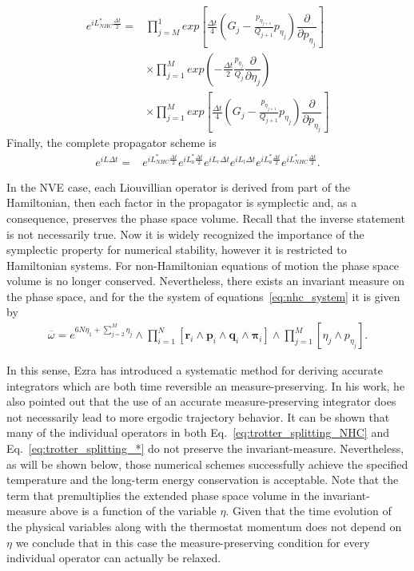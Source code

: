 \documentclass[aip,jcp,reprint,amsmath,amssymb]{revtex4-1}
\newcommand{\vt}[1]{\boldsymbol{\mathbf{#1}}}           %
\newcommand{\diff}[2]{\dfrac{\partial #1}{\partial #2}} %
\begin{document}
\begin{equation}
\begin{split}
e^{iL^\ast_{NHC} \frac{\Delta t}{2}} = &\prod_{j=M}^{1} exp\left[\frac{\Delta t}{4} \left( G_j - \frac{p_{\eta_{j+1}}}{Q_{j+1}} p_{\eta_j} \right) \diff{}{p_{\eta_j}}\right] \\
&\times\prod_{j=1}^{M} exp\left(-\frac{\Delta t}{2}  \frac{p_{\eta_j}}{Q_j}\diff{}{\eta_j}\right)   \\
&\times \prod_{j=1}^{M} exp\left[\frac{\Delta t}{4} \left( G_j - \frac{p_{\eta_{j+1}}}{Q_{j+1}} p_{\eta_j} \right) \diff{}{p_{\eta_j}}\right]
\end{split}
\end{equation}
Finally, the complete propagator scheme is
\begin{equation}
\label{eq:trotter_splitting_*}
\begin{split}
e^{i L \Delta t} = &e^{i L^\ast_{NHC} \frac{\Delta t}{2}} e^{i L^\ast_a \frac{\Delta t}{2}} e^{i L_r \Delta t} e^{i L_t \Delta t} e^{i L^\ast_a \frac{\Delta t}{2}} e^{i L^\ast_{NHC} \frac{\Delta t}{2}}.
\end{split}
\end{equation}

In the NVE case, each Liouvillian operator is derived from part of the Hamiltonian, then each factor in the propagator is symplectic and, as a consequence, preserves the phase space volume. Recall that the inverse statement is not necessarily true. Now it is widely recognized the importance of the symplectic property for numerical stability,\cite{Skeel1997} however it is restricted to Hamiltonian systems. For non-Hamiltonian equations of motion the phase space volume is no longer conserved. Nevertheless, there exists an invariant measure on the phase space, and for the the system of equations~\ref{eq:nhc_system} it is given by
\begin{align*}
\overline{\omega} = e^{6N \eta_1 + \sum_{j=2}^M \eta_j} \wedge \prod_{i=1}^{N}[\vt {r}_i \wedge\vt {p}_i\wedge \vt {q}_i\wedge \vt {\pi}_i ] \wedge \prod_{j=1}^{M}[ \eta_j\wedge p_{\eta_j} ].
\end{align*}

In this sense, Ezra \cite{Ezra2006} has introduced a systematic method for deriving accurate integrators which are both time  reversible an measure-preserving. In his work, he also pointed out that the use of an accurate measure-preserving integrator does not necessarily lead to more ergodic trajectory behavior. It can be shown that many of the individual operators in both Eq.~\ref{eq:trotter_splitting_NHC} and Eq.~\ref{eq:trotter_splitting_*} do not preserve the invariant-measure. Nevertheless, as will be shown below, those numerical schemes successfully achieve the specified temperature and the long-term energy conservation is acceptable. Note that the term that premultiplies the extended phase space volume in the invariant-measure above is a function of the variable $\eta$. Given that the time evolution of the physical variables along with the thermostat momentum does not depend on $\eta$ we conclude that in this case the measure-preserving condition for every individual operator can actually be relaxed.
\end{document}
